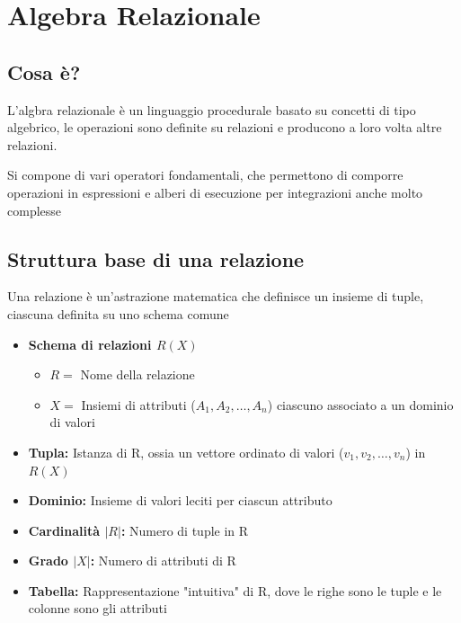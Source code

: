\chapter{Algebra Relazionale}
\section{Cosa è?}
L'algbra relazionale è un linguaggio procedurale basato su concetti di tipo algebrico, le operazioni sono definite su relazioni e producono a loro volta altre relazioni.

Si compone di vari operatori fondamentali, che permettono di comporre operazioni in espressioni e alberi di esecuzione per integrazioni anche molto complesse

\section{Struttura base di una relazione}
Una relazione è un'astrazione matematica che definisce un insieme di tuple, ciascuna definita su uno schema comune

\begin{itemize}
    \item \textbf{Schema di relazioni $R(X)$}
    \begin{itemize}
        \item $R=$ Nome della relazione
        \item $X=$ Insiemi di attributi ($A_1,A_2,\dots,A_n$) ciascuno associato a un dominio di valori
    \end{itemize}
    \item \textbf{Tupla:} Istanza di R, ossia un vettore ordinato di valori ($v_1,v_2,\dots,v_n$) in $R(X)$
    \item \textbf{Dominio:} Insieme di valori leciti per ciascun attributo
    \item \textbf{Cardinalità $|R|$:} Numero di tuple in R
    \item \textbf{Grado $|X|$:} Numero di attributi di R
    \item \textbf{Tabella:} Rappresentazione "intuitiva" di R, dove le righe sono le tuple e le colonne sono gli attributi
\end{itemize}

